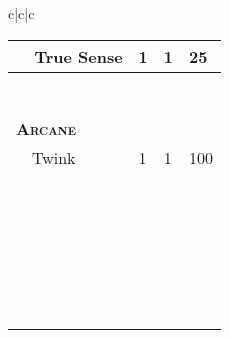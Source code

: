 \documentclass{article}
\begin{document}
\begin{tabular}{c|c|c}
\begin{tabular}{p{1.4in}|p{.2in}|p{.2in}|p{.2in}}
    \hline
    ~~True Sense & 1 & 1 & 25 \\
    \hline
    & & & \\
    \hline
    & & & \\
    \hline
    & & & \\
    \hline
    & & & \\
    \hline
    & & & \\
    \hline
    & & & \\
    \hline
    & & & \\
    \hline
    \hline
    \hline
    \textsc{\textbf{Arcane}} & & & \\
    \hline
    ~~Twink & 1 & 1 & 100 \\
    \hline
    & & & \\
    \hline
    & & & \\
    \hline
    & & & \\
    \hline
    & & & \\
    \hline
    & & & \\
    \hline
    & & & \\
    \hline
    & & & \\
    \hline
    & & & \\
    \hline
    & & & \\
    \hline
    & & & \\
    \hline
    & & & \\
    \hline
    & & & \\
    \hline
    & & & \\
    \hline
    & & & \\
    \hline
    & & & \\
    \hline
    & & & \\
    \hline
    & & & \\
    \hline
    & & & \\
    \hline
    & & & \\
    \hline
    & & & \\
    \hline
    & & & \\
    \hline
    & & & \\
    \hline
    & & & \\
    \hline
    & & & \\
    \hline
    & & & \\
    \hline
    & & & \\
  \end{tabular} \\
\end{tabular}
\end{document}
